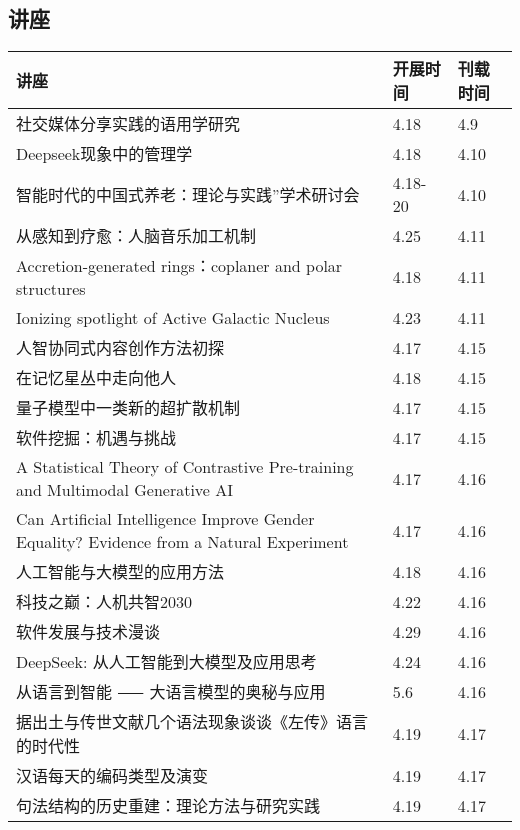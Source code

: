 \documentclass[letterpaper, 12pt]{article}
\begin{document}
\begin{multicols}{2}
\pagebreak

\section{讲座}
\begin{tabular}{|>{\centering\arraybackslash}m{}|m{}|m{}|}
    \hline
    讲座 & 开展时间 & 刊载时间\\
    \hline\hline
    社交媒体分享实践的语用学研究 & 4.18 & 4.9\\\hline
    Deepseek现象中的管理学 & 4.18 & 4.10\\\hline
    智能时代的中国式养老：理论与实践”学术研讨会 & 4.18-20 & 4.10\\\hline
    从感知到疗愈：人脑音乐加工机制 & 4.25 & 4.11\\\hline
    Accretion-generated rings：coplaner and polar structures & 4.18 & 4.11\\\hline
    Ionizing spotlight of Active Galactic Nucleus & 4.23 & 4.11\\\hline
    人智协同式内容创作方法初探 & 4.17 & 4.15\\\hline
    在记忆星丛中走向他人 & 4.18 & 4.15\\\hline
    量子模型中一类新的超扩散机制 & 4.17 & 4.15\\\hline
    软件挖掘：机遇与挑战 & 4.17 & 4.15\\\hline
    A Statistical Theory of Contrastive Pre-training and Multimodal Generative AI & 4.17 & 4.16\\\hline
    Can Artificial Intelligence Improve Gender Equality? Evidence from a Natural Experiment & 4.17 & 4.16\\\hline
    人工智能与大模型的应用方法 & 4.18 & 4.16\\\hline
    科技之巅：人机共智2030 & 4.22 & 4.16\\\hline
    软件发展与技术漫谈 & 4.29 & 4.16\\\hline
    DeepSeek: 从人工智能到大模型及应用思考 & 4.24 & 4.16\\\hline
    从语言到智能 ⸺ 大语言模型的奥秘与应用 & 5.6 & 4.16\\\hline
    据出土与传世文献几个语法现象谈谈《左传》语言的时代性 & 4.19 & 4.17\\\hline
    汉语{每天}的编码类型及演变 & 4.19 & 4.17\\\hline
    句法结构的历史重建：理论方法与研究实践 & 4.19 & 4.17\\\hline

\end{tabular}
\end{multicols}
\end{document}
